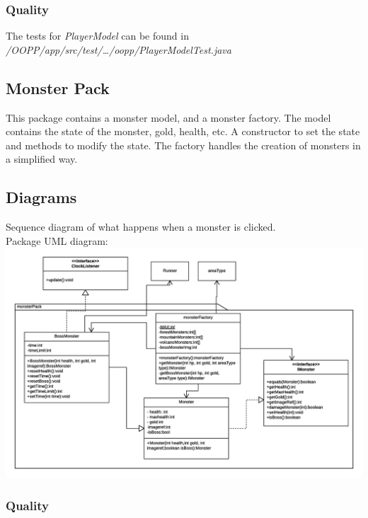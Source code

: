 \documentclass{article}
\begin{document}
\subsubsection{Quality}
The tests for \emph{PlayerModel} can be found in \emph{/OOPP/app/src/test/\ldots/oopp/PlayerModelTest.java}

\subsection{Monster Pack}
This package contains a monster model, and a monster factory. The model contains the state of the monster, gold, health, etc. A constructor to set the state and methods
to modify the state. The factory handles the creation of monsters in a simplified way.

\subsection{Diagrams}
\begin{center}
    Sequence diagram of what happens when a monster is clicked.\\
    Package UML diagram:
    \includegraphics[scale=0.5]{uml/monsterPackUml.png}
\end{center}

\subsubsection{Quality}
\end{document}
